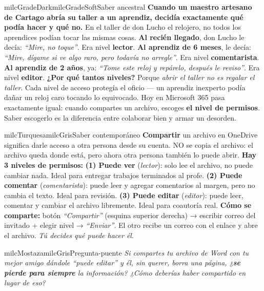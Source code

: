 \documentclass[11pt,letterpaper]{article}
\begin{document}
\begin{softbox}{milcGradeDark}{milcGradeSoft}{Saber ancestral}
\textbf{Cuando un maestro artesano de Cartago abría su taller a un aprendiz, decidía exactamente qué podía hacer y qué no.} En el taller de don Lucho el relojero, no todos los aprendices podían tocar las mismas cosas. \textbf{Al recién llegado}, don Lucho le decía: \emph{``Mire, no toque''}. Era nivel \textbf{lector}. \textbf{Al aprendiz de 6 meses}, le decía: \emph{``Mire, dígame si ve algo raro, pero todavía no arregle''}. Era nivel \textbf{comentarista}. \textbf{Al aprendiz de 2 años}, ya: \emph{``Tome este reloj y repárelo, después le reviso''}. Era nivel \textbf{editor}. \textbf{¿Por qué tantos niveles?} Porque \emph{abrir el taller no es regalar el taller}. Cada nivel de acceso protegía el oficio --- un aprendiz inexperto podía dañar un reloj caro tocando lo equivocado. Hoy en Microsoft 365 pasa exactamente igual: cuando compartes un archivo, escoges \textbf{el nivel de permisos}. Saber escogerlo es la diferencia entre colaborar bien y armar un desorden.
\end{softbox}

\begin{softbox}{milcTurquesa}{milcGris}{Saber contemporáneo}
\textbf{Compartir} un archivo en OneDrive significa darle acceso a otra persona desde su cuenta. NO se copia el archivo: el archivo queda donde está, pero ahora otra persona también lo puede abrir. \textbf{Hay 3 niveles de permisos:} \textbf{(1) Puede ver} (\emph{lector}): solo lee el archivo, no puede cambiar nada. Ideal para entregar trabajos terminados al profe. \textbf{(2) Puede comentar} (\emph{comentarista}): puede leer y agregar comentarios al margen, pero no cambia el texto. Ideal para revisión. \textbf{(3) Puede editar} (\emph{editor}): puede leer, comentar y cambiar el archivo libremente. Ideal para coautoría real. \textbf{Cómo se comparte:} botón \emph{``Compartir''} (esquina superior derecha) → escribir correo del invitado + elegir nivel → \emph{``Enviar''}. El otro recibe un correo con el enlace y abre el archivo. \emph{Tú decides qué puede hacer él}.
\end{softbox}

\begin{softbox}{milcMostaza}{milcGris}{Pregunta-puente}
\textit{Si compartes tu archivo de Word con tu mejor amigo dándole \emph{``puede editar''} y él, sin querer, borra una página, ¿\textbf{se pierde para siempre} la información? ¿Cómo deberías haber compartido en lugar de eso?}
\end{softbox}
\end{document}
